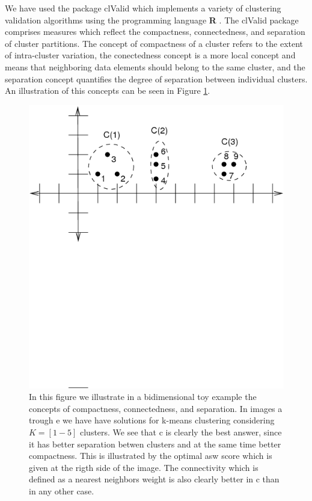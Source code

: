We have  used the package clValid \cite{brock2008}  which implements a
variety  of  clustering validation  algorithms  using the  programming
language  \textbf{R}  \cite{rcite}.   The  clValid  package  comprises
measures which reflect  the compactness, connectedness, and separation
of cluster partitions. The concept  of compactness of a cluster refers
to the extent of  intra-cluster variation, the conectedness concept is
a more local  concept and means that neighboring  data elements should
belong to the same cluster, and the separation concept quantifies the
degree of separation between individual clusters. An illustration of
this concepts can be seen in Figure \ref{fig:concomsep}.

\begin{figure}
\centering
\includegraphics[scale=0.3]{Appendix/consilcom.png}
\caption{In this  figure we illustrate in a  bidimensional toy example
  the  concepts  of compactness,  connectedness,  and separation.   In
  images a\) trough e\) we  have have solutions for k-means clustering
  considering $K=[1-5]$ clusters.  We  see that c\) is  clearly the best
  answer, since  it has better  separation betwen clusters and  at the
  same time better compactness. This is illustrated by the optimal asw
  score  which  is  given  at  the  rigth  side  of  the  image.   The
  connectivity which is defined as  a nearest neighbors weight is also
  clearly better in c\) than in any other case.}
\label{fig:concomsep}
\end{figure}  

